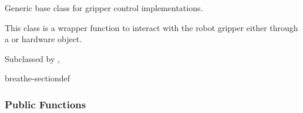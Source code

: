 \documentclass[letterpaper,10pt,english]{sphinxmanual}
\begin{document}
\begin{fulllineitems}
\label{\detokenize{code/bioscara_hardware_drivers/index:_CPPv4N25bioscara_hardware_drivers25bioscara_hardware_drivers11BaseGripperE}}\label{\detokenize{code/bioscara_hardware_drivers/index:_CPPv3N25bioscara_hardware_drivers25bioscara_hardware_drivers11BaseGripperE}}\label{\detokenize{code/bioscara_hardware_drivers/index:_CPPv2N25bioscara_hardware_drivers25bioscara_hardware_drivers11BaseGripperE}}\label{\detokenize{code/bioscara_hardware_drivers/index:bioscara_hardware_drivers::bioscara_hardware_drivers::BaseGripper}}
\pysigstartsignatures
\pysigstartmultiline
\pysigline
{\label{\detokenize{code/bioscara_hardware_drivers/index:classbioscara__hardware__drivers_1_1BaseGripper}}}
\pysigstopmultiline
\pysigstopsignatures{}
\sphinxAtStartPar
Generic base class for gripper control implementations. 

\sphinxAtStartPar
This class is a wrapper function to interact with the robot gripper either through a {\hyperref[\detokenize{code/bioscara_hardware_drivers/index:classbioscara__hardware__drivers_1_1MockGripper}]{}} or hardware {\hyperref[\detokenize{code/bioscara_hardware_drivers/index:classbioscara__hardware__drivers_1_1Gripper}]{}} object. 

\sphinxAtStartPar
Subclassed by {\hyperref[\detokenize{code/bioscara_hardware_drivers/index:classbioscara__hardware__drivers_1_1Gripper}]{}}, {\hyperref[\detokenize{code/bioscara_hardware_drivers/index:classbioscara__hardware__drivers_1_1MockGripper}]{}}

\begin{sphinxuseclass}{breathe-sectiondef}\subsubsection*{Public Functions}


\end{sphinxuseclass}
\end{fulllineitems}
\end{document}
